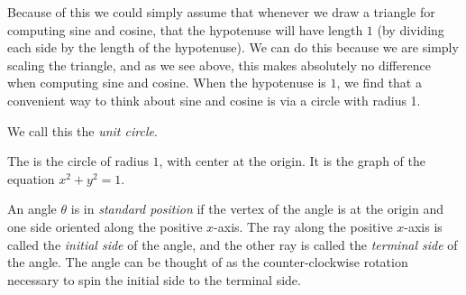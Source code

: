 \documentclass[nooutcomes]{ximera}
\begin{document}
Because of this we could simply assume that whenever we draw a triangle
for computing sine and cosine, that the hypotenuse will have length $1$ (by dividing each side by the length of the hypotenuse). 
We can do this because we are simply scaling the triangle, and as we see
above, this makes absolutely no difference when computing sine and
cosine. When the hypotenuse is $1$, we find that a convenient
way to think about sine and cosine is via a circle with radius 1.
\begin{image}
\end{image}
We call this the \emph{unit circle}. 
\begin{definition}
	The  is the circle of radius $1$, with center at the origin. It is the graph of the equation $x^2 + y^2 = 1$.
\end{definition}

An angle $\theta$ is in \emph{standard position} if the vertex of the angle is at the origin and one side oriented along the positive $x$-axis. The ray along the positive $x$-axis is called the \emph{initial side} of the angle, and the
other ray is called the \emph{terminal side} of the angle. The angle can be thought of as the counter-clockwise rotation necessary to spin the initial side to the terminal side. 
\end{document}
